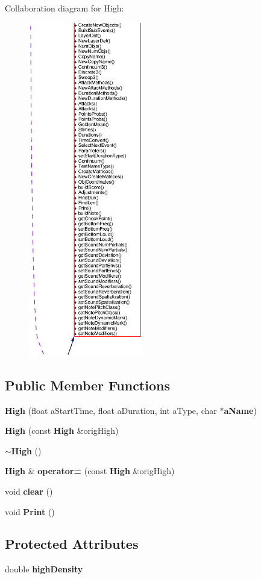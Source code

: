 Collaboration diagram for High:\begin{figure}[H]
\begin{center}
\leavevmode
\includegraphics[width=141pt]{classHigh__coll__graph}
\end{center}
\end{figure}
\subsection*{Public Member Functions}
\begin{CompactItemize}
\item 
{\bf High} (float a\-Start\-Time, float a\-Duration, int a\-Type, char $\ast${\bf a\-Name})
\item 
{\bf High} (const  {\bf High} \&orig\-High)
\item 
{\bf $\sim$High} ()
\item 
{\bf High} \& {\bf operator=} (const  {\bf High} \&orig\-High)
\item 
void {\bf clear} ()
\item 
void {\bf Print} ()
\end{CompactItemize}
\subsection*{Protected Attributes}
\begin{CompactItemize}
\item 
double {\bf high\-Density}
\end{CompactItemize}


